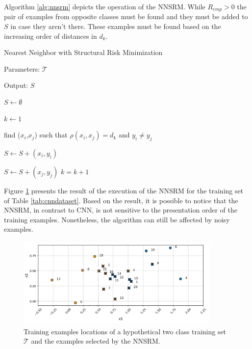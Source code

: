 Algorithm \ref{alg:nnsrm} depicts the operation of the NNSRM. While $R_{emp} > 0$ the pair of examples from opposite classes must be found and they must be added to $S$ in case they aren't there. These examples must be found based on the increasing order of distances in $d_k$.

\vspace{0.2cm}

\begin{algorithm}[H]
    \label{alg:nnsrm}
    \caption{Nearest Neighbor with Structural Risk Minimization}
    
    Parameters: $\mathcal{T}$
    
    Output: $S$
    
    
    \begin{algorithmic}[1] 
    \STATE $S \gets \emptyset$
   
    \STATE $k \gets 1$ 
   
   
   
    \STATE find ($x_i$,$x_j$) such that $\rho(x_i,x_j) = d_k$ and $y_i \neq y_j$     
    
            \STATE $S \gets S + (x_i, y_i)$
    \ENDIF
    
          \STATE $S \gets S + (x_j, y_j)$
    \ENDIF
    \STATE $k = k + 1$     
    
    \ENDWHILE 
    \end{algorithmic}
    
    
\end{algorithm}

\vspace{0.2cm}

Figure \ref{fig:nnsrmdataset} presents the result of the execution of the NNSRM for the training set of Table \ref{tab:cnndataset}. Based on the result, it is possible to notice that the NNSRM, in contrast to CNN, is not sensitive to the presentation order of the training examples. Nonetheless, the algorithm can still be affected by noisy examples. 

\begin{figure}[ht!]
    \centering
    \includegraphics[height = 4.5cm, width =  10cm]{"Part 3 - Learning Systems/Supervised Learning/k-Nearest Neighbors/figures/nnsrmdataset.png"}
    \caption{Training examples locations of a hypothetical two class training set $\mathcal{T}$ and the examples selected by the NNSRM.}
    \label{fig:nnsrmdataset}
\end{figure}

